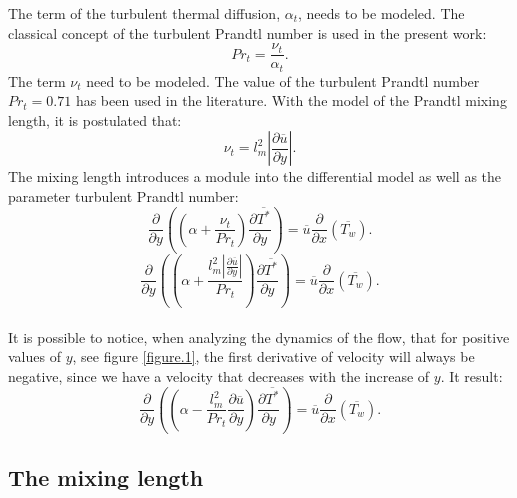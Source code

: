 \documentclass[10pt]{article} %
\begin{document}
The term of the turbulent thermal diffusion, $\alpha_t$, needs to be modeled. The classical concept of the turbulent Prandtl number is used in the present work:
\begin{equation}
Pr_t = \frac{\nu_t}{\alpha_t}.
\end{equation} 
The term $ \nu_t $ need to be modeled. The value of the turbulent Prandtl number $ Pr_t = 0.71 $ has been used in the literature.
With the model of the Prandtl mixing length, it is postulated that:
\begin{equation}
\nu_t = {l^2_m} \left| \frac{\partial \overline{u}}{\partial y} \right|.
\end{equation}
The mixing length introduces a module into the differential model as well as the parameter turbulent Prandtl number:
\\
\begin{equation}
{\frac{\partial{}}{\partial{y}}} \left( \left( \alpha   
+ \frac{\nu_t}{Pr_t} \right) \frac{\partial \overline{T^\ast}}{\partial y} \right)
= 
\overline{u}\frac{\partial{}}{\partial{x}}\left(\overline{T_w}\right)  .
\end{equation}
\begin{equation}\label{equationquasela}
{\frac{\partial{}}{\partial{y}}} \left( \left( \alpha   
+ \frac{{l^2_m} \left| \frac{\partial \overline{u}}{\partial y} \right|}{Pr_t} \right) \frac{\partial \overline{T^\ast}}{\partial y} \right)
= 
\overline{u}\frac{\partial{}}{\partial{x}}\left(\overline{T_w}\right)  .
\end{equation}
\\

It is possible to notice, when analyzing the dynamics of the flow, that for positive values of $ y $, see figure \ref{figure.1}, the first derivative of velocity will always be negative, since we have a velocity that decreases with the increase of $ y $. It result:\\
\begin{equation}
{\frac{\partial{}}{\partial{y}}} \left( \left( \alpha   
- \frac{{l^2_m}}{Pr_t}\frac{\partial \overline{u}}{\partial y} \right) \frac{\partial \overline{T^\ast}}{\partial y} \right)
= 
\overline{u}\frac{\partial{}}{\partial{x}}\left(\overline{T_w}\right)  .
\end{equation}



\subsection{The mixing length}
\end{document}
